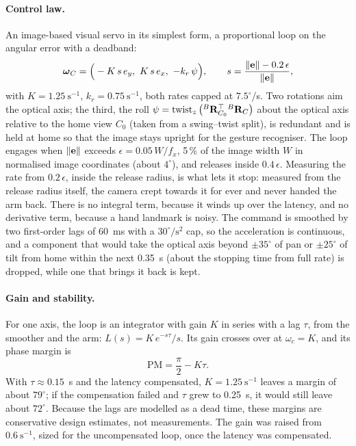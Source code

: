 \paragraph{Control law.} An image-based visual servo \cite{chaumette2006vs} in its simplest form,
a proportional loop on the angular error with a deadband:
\begin{equation}
\boldsymbol{\omega}_C = \Big(-K\,s\,e_y,\ K\,s\,e_x,\ -k_r\,\psi\Big),
\qquad
s=\frac{\norm{\vect{e}}-0.2\,\epsilon}{\norm{\vect{e}}},
\label{eq:aim_law}
\end{equation}
with $K=1.25~\mathrm{s}^{-1}$, $k_r=0.75~\mathrm{s}^{-1}$, both rates capped at $7.5^\circ$/s.
Two rotations aim the optical axis; the third, the roll
$\psi=\operatorname{twist}_z\big({}^{B}\mathbf{R}_{C_0}^{\top}{}^{B}\mathbf{R}_{C}\big)$ about the optical axis relative to
the home view $C_0$ (taken from a swing--twist split), is redundant and is held at home so that the
image stays upright for the gesture recogniser. The loop engages when $\left\lVert\mathbf{e}\right\rVert$ exceeds
$\epsilon=0.05\,W/f_x$, 5\,\% of the image width $W$ in normalised image coordinates (about
$4^\circ$), and releases inside $0.4\,\epsilon$. Measuring the rate from
$0.2\,\epsilon$, inside the release radius, is what lets it stop: measured from the release radius
itself, the camera crept towards it for ever and never handed the arm back. There is no integral
term, because it winds up over the latency, and no derivative term, because a hand landmark is
noisy. The command is smoothed by two first-order lags of 60~ms with a $30^\circ/\mathrm{s}^2$
cap, so the acceleration is continuous, and a component that would take the optical axis beyond
$\pm35^\circ$ of pan or $\pm25^\circ$ of tilt from home within the next 0.35~s (about the
stopping time from full rate) is dropped, while one that brings it back is kept.

\paragraph{Gain and stability.} For one axis, the loop is an integrator with gain $K$ in series
with a lag $\tau$, from the smoother and the arm: $L(s)=K\,e^{-s\tau}/s$. Its gain crosses over at
$\omega_c=K$, and its phase margin is
\begin{equation}
\mathrm{PM}=\frac{\pi}{2}-K\tau .
\label{eq:aim_pm}
\end{equation}
With $\tau\approx0.15$~s and the latency compensated, $K=1.25~\mathrm{s}^{-1}$ leaves a margin of
about $79^\circ$; if the compensation failed and $\tau$ grew to 0.25~s, it would still leave about
$72^\circ$. Because the lags are modelled as a dead time, these margins are conservative design
estimates, not measurements. The gain was raised from $0.6~\mathrm{s}^{-1}$, sized for the uncompensated loop, once
the latency was compensated.

